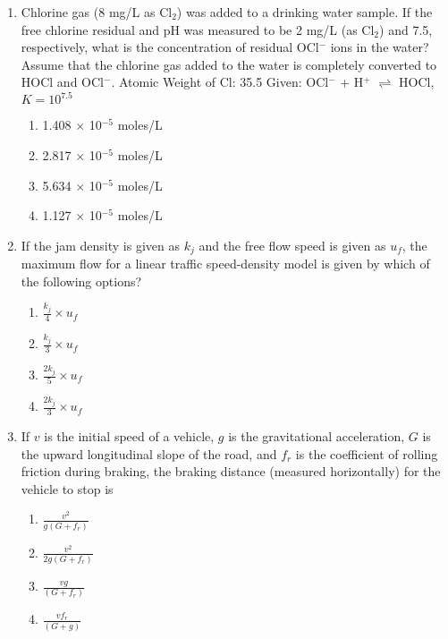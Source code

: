 \documentclass[journal,12pt,onecolumn]{IEEEtran}
\theoremstyle{remark}
\begin{document}
\begin{enumerate}
    \item Chlorine gas (8 mg/L as Cl$_2$) was added to a drinking water sample. If the free chlorine residual and pH was measured to be 2 mg/L (as Cl$_2$) and 7.5, respectively, what is the concentration of residual OCl$^-$ ions in the water? Assume that the chlorine gas added to the water is completely converted to HOCl and OCl$^-$. Atomic Weight of Cl: 35.5
    Given: OCl$^-$ + H$^+$ $\rightleftharpoons$ HOCl,   $K = 10^{7.5}$
    \begin{enumerate}
        \item 1.408 $\times$ 10$^{-5}$ moles/L
        \item 2.817 $\times$ 10$^{-5}$ moles/L
        \item 5.634 $\times$ 10$^{-5}$ moles/L
        \item 1.127 $\times$ 10$^{-5}$ moles/L
    \end{enumerate}

    \item If the jam density is given as $k_j$ and the free flow speed is given as $u_f$, the maximum flow for a linear traffic speed-density model is given by which of the following options?
    \begin{enumerate}
        \item $\frac{k_j}{4} \times u_f$
        \item $\frac{k_j}{3} \times u_f$
        \item $\frac{2k_j}{5} \times u_f$
        \item $\frac{2k_j}{3} \times u_f$
    \end{enumerate}

    \item If $v$ is the initial speed of a vehicle, $g$ is the gravitational acceleration, $G$ is the upward longitudinal slope of the road, and $f_r$ is the coefficient of rolling friction during braking, the braking distance (measured horizontally) for the vehicle to stop is

    \begin{enumerate}
        \item $\frac{v^2}{g(G + f_r)}$
        \item $\frac{v^2}{2g(G + f_r)}$
        \item $\frac{vg}{(G + f_r)}$
        \item $\frac{vf_r}{(G + g)}$
    \end{enumerate}


\end{enumerate}
\end{document}
